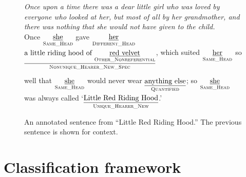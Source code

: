 \documentclass[11pt,letterpaper]{article}
\newcommand{\glosst}[2]{\ensuremath{\underset{\textrm{#2}}{\uline{\textrm{#1}}}}} %
\newcommand{\llbl}[1]{\mbox{\textsc{#1}}} %
\begin{document}
\begin{figure*}[t]\small
\textit{Once upon a time there was a dear little girl who was loved by everyone who looked at her, but most of all by her grandmother, and there was nothing that she would not have given to the child.}
\\[5pt]
Once \glosst{she}{\llbl{Same\_Head}} gave \glosst{her}{\llbl{Different\_Head}} 
\glosst{a little riding hood of \glosst{red velvet}{\llbl{Other\_Nonreferential}}}{$\underset{~}{\llbl{Nonunique\_Hearer\_New\_Spec}}$}, 
which suited \glosst{her}{\llbl{Same\_Head}} so well that \glosst{she}{\llbl{Same\_Head}} 
would never wear \glosst{anything else}{\llbl{Quantified}}; so \glosst{she}{\llbl{Same\_Head}} was always called 
`\glosst{Little Red Riding Hood}{\llbl{Unique\_Hearer\_New}}.'
\caption{An annotated sentence from ``Little Red Riding Hood.'' The previous sentence is shown for context.}
\label{fig:excerpt}
\end{figure*}





\section{Classification framework}\label{sec:modeling}
\end{document}
